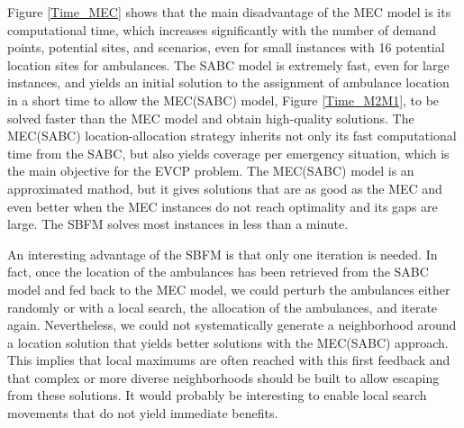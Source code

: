 Figure \ref{Time_MEC} shows that the main disadvantage of the MEC model is its computational time, which increases significantly with the number of demand points, potential sites, and scenarios, even for small instances with 16 potential location sites for ambulances. The SABC model is extremely fast, even for large instances, and yields an initial solution to the assignment of ambulance location in a short time to allow the MEC(SABC) model, Figure \ref{Time_M2M1}, to be solved faster than the MEC model and obtain high-quality solutions. The MEC(SABC) location-allocation strategy inherits not only its fast computational time from the SABC, but also yields coverage per emergency situation, which is the main objective for the EVCP problem. The MEC(SABC) model is an approximated mathod, but it gives solutions that are as good as the MEC and even better when the MEC instances do not reach optimality and its gaps are large. The SBFM solves most instances in less than a minute.  

An interesting advantage of the SBFM is that only one iteration is needed. In fact, once the location of the ambulances has been retrieved from the SABC model and fed back to the MEC model, we could perturb the ambulances either randomly or with a local search, the allocation of the ambulances, and iterate again. Nevertheless, we could not systematically generate a neighborhood around a location solution that yields better solutions with the MEC(SABC) approach. This implies that local maximums are often reached with this first feedback and that complex or more diverse neighborhoods should be built to allow escaping from these solutions. It would probably be interesting to enable local search movements that do not yield immediate benefits.  

